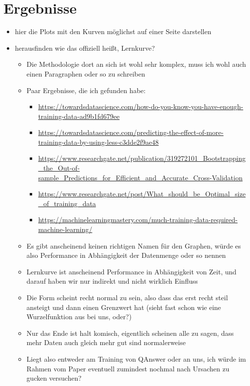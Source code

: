 \documentclass[utf8,biblatex]{lni}
\begin{document}
\section{Ergebnisse}

\begin{itemize}
\item hier die Plots mit den Kurven möglichst auf einer Seite darstellen
\item herausfinden wie das offiziell heißt, Lernkurve?
  \begin{itemize}
    \item Die Methodologie dort an sich ist wohl sehr komplex, muss ich wohl auch einen Paragraphen oder so zu schreiben
    \item Paar Ergebnisse, die ich gefunden habe:
    \begin{itemize}
      \item \url{https://towardsdatascience.com/how-do-you-know-you-have-enough-training-data-ad9b1fd679ee}
      \item \url{https://towardsdatascience.com/predicting-the-effect-of-more-training-data-by-using-less-c3dde2f9ae48}
      \item \url{https://www.researchgate.net/publication/319272101\_Bootstrapping_the_Out-of-sample\_Predictions\_for\_Efficient\_and\_Accurate\_Cross-Validation}
      \item \url{https://www.researchgate.net/post/What\_should\_be\_Optimal\_size\_of\_training\_data}
      \item \url{https://machinelearningmastery.com/much-training-data-required-machine-learning/}
    \end{itemize}
    \item Es gibt anscheinend keinen richtigen Namen für den Graphen, würde es also Performance in Abhängigkeit der Datenmenge oder so nennen
    \item Lernkurve ist anscheinend Performance in Abhängigkeit von Zeit, und darauf haben wir nur indirekt und nicht wirklich Einfluss
    \item Die Form scheint recht normal zu sein, also dass das erst recht steil ansteigt und dann einen Grenzwert hat (sieht fast schon wie eine Wurzelfunktion aus bei uns, oder?)
    \item Nur das Ende ist halt komisch, eigentlich scheinen alle zu sagen, dass mehr Daten auch gleich mehr gut sind normalerweise
    \item Liegt also entweder am Training von QAnswer oder an uns, ich würde im Rahmen vom Paper eventuell zumindest nochmal nach Ursachen zu gucken versuchen?
  \end{itemize}
\end{itemize}
\end{document}
